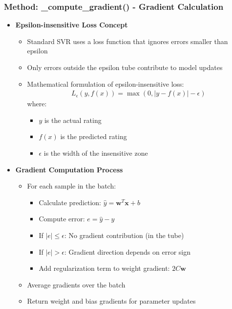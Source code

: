\documentclass{beamer}
\begin{document}
\begin{frame}
\frametitle{Method: \_compute\_gradient() - Gradient Calculation}

\begin{itemize}
    \item \textbf{Epsilon-insensitive Loss Concept}
    \begin{itemize}
        \item Standard SVR uses a loss function that ignores errors smaller than epsilon
        \item Only errors outside the epsilon tube contribute to model updates
        \item Mathematical formulation of epsilon-insensitive loss:
        \begin{align*}
        L_{\epsilon}(y, f(x)) = \max(0, |y - f(x)| - \epsilon)
        \end{align*}
        where:
        \begin{itemize}
            \item $y$ is the actual rating
            \item $f(x)$ is the predicted rating
            \item $\epsilon$ is the width of the insensitive zone
        \end{itemize}
    \end{itemize}
    
    \item \textbf{Gradient Computation Process}
    \begin{itemize}
        \item For each sample in the batch:
        \begin{itemize}
            \item Calculate prediction: $\hat{y} = \mathbf{w}^T \mathbf{x} + b$
            \item Compute error: $e = \hat{y} - y$
            \item If $|e| \leq \epsilon$: No gradient contribution (in the tube)
            \item If $|e| > \epsilon$: Gradient direction depends on error sign
            \item Add regularization term to weight gradient: $2C\mathbf{w}$
        \end{itemize}
        \item Average gradients over the batch
        \item Return weight and bias gradients for parameter updates
    \end{itemize}
\end{itemize}
\end{frame}
\end{document}
